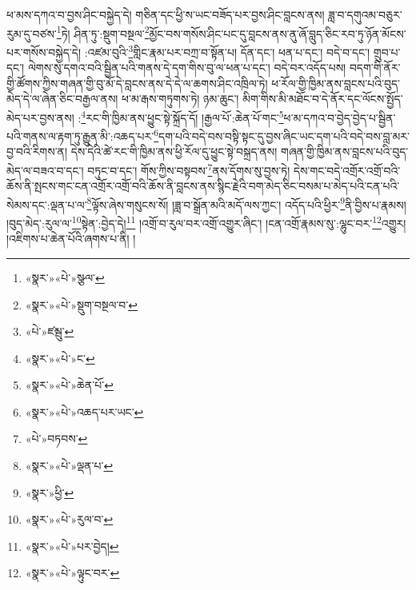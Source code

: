 ཕ་མས་དཀའ་བ་བྱས་ཤིང་བསྐྱེད་དེ། གཅིན་དང་ཕྱི་ས་ཡང་བཟོད་པར་བྱས་ཤིང་བླངས་ནས། ཟླ་བ་དགུའམ་བཅུར་རུམ་དུ་བཙས་\footnote{«སྣར་»«པེ་»སྩལ་}ཏེ། ཤིན་ཏུ་:སྡུག་བསྔལ་\footnote{«སྣར་»«པེ་»སྡུག་བསྔལ་བ་}མྱོང་བས་གསོས་ཤིང་པང་དུ་བླངས་ནས་ནུ་ཞོ་བླུད་ཅིང་རབ་ཏུ་ཉོན་མོངས་པར་གསོས་བསྐྱེད་དེ། :འཛམ་བུའི་\footnote{«པེ་»ཛམྦུ་}གླིང་རྣམ་པར་བཀྲ་བ་སྟོན་པ། དོན་དང་། ཕན་པ་དང་། བདེ་བ་དང་། གྲུབ་པ་དང་། ལེགས་སུ་དགའ་བའི་སྦྱིན་པའི་གནས་དེ་དག་གིས་བུ་ལ་ཕན་པ་དང་། བདེ་བར་འདོད་པས། བདག་གི་ནོར་གྱི་ཚོགས་ཀྱིས་གཞན་གྱི་བུ་མོ་དེ་བླངས་ནས་དེ་དེ་ལ་ཆགས་ཤིང་འཁྲིལ་ཏེ། ཕ་རོལ་གྱི་ཁྱིམ་ནས་བླངས་པའི་བུད་མེད་དེ་ལ་ཞེན་ཅིང་བརྒྱལ་ནས། ཕ་མ་རྒས་གཏུགས་ཏེ། ཉམ་ཆུང་། མིག་གིས་མི་མཐོང་བ་དེ་ནོར་དང་ལོངས་སྤྱོད་མེད་པར་བྱས་ནས། :\footnote{«སྣར་»«པེ་»ང་}རང་གི་ཁྱིམ་ནས་ཕྱུང་སྟེ་སྐྲོད་དོ། །རྒྱལ་པོ་:ཆེན་པོ་གང་\footnote{«སྣར་»«པེ་»ཆེན་པོ་}ཕ་མ་དཀའ་བ་བྱེད་བྱེད་པ་སྦྱིན་པའི་གནས་ལ་རྟག་ཏུ་རྒྱུན་མི་:འཆད་པར་\footnote{«སྣར་»«པེ་»འཆད་པར་ཡང་}དག་པའི་བདེ་བས་བསྟི་སྟང་དུ་བྱས་ཞིང་ཡང་དག་པའི་བདེ་བས་བླ་མར་བྱ་བའི་རིགས་ན། དེས་དེའི་ཚེ་རང་གི་ཁྱིམ་ནས་ཕྱི་རོལ་དུ་ཕྱུང་སྟེ་བསྐྲད་ནས། གཞན་གྱི་ཁྱིམ་ནས་བླངས་པའི་བུད་མེད་ལ་བཟའ་བ་དང་། བཏུང་བ་དང་། གོས་ཀྱིས་བསྟབས་\footnote{«པེ་»བཏབས་}ནས་དོགས་སུ་བྱས་ཏེ། དེས་གང་བདེ་འགྲོར་འགྲོ་བའི་ཆོས་ནི་སྤངས་གང་ངན་འགྲོར་འགྲོ་བའི་ཆོས་ནི་བླངས་ནས་སྙིང་རྗེའི་བག་མེད་ཅིང་བསམ་པ་མེད་པའི་ངན་པའི་སེམས་དང་:ལྡན་པ་ལ་\footnote{«སྣར་»«པེ་»ལྡན་པ་}ལྟོས་ཞེས་གསུངས་སོ། །ཟླ་བ་སྒྲོན་མའི་མདོ་ལས་ཀྱང་། འདོད་པའི་ཕྱིར་\footnote{«སྣར་»ཕྱི་}ནི་བྱིས་པ་རྣམས། །བུད་མེད་:རུལ་ལ་\footnote{«སྣར་»«པེ་»རུལ་བ་}སྟེན་:བྱེད་དེ།\footnote{«སྣར་»«པེ་»པར་བྱེད།} །འགྲོ་བ་རུལ་བར་འགྲོ་འགྱུར་ཞིང་། །ངན་འགྲོ་རྣམས་སུ་:ལྷུང་བར་\footnote{«སྣར་»«པེ་»ལྟུང་བར་}འགྱུར། །འཇིགས་པ་ཆེན་པོའི་ཞགས་པ་ནི། །
